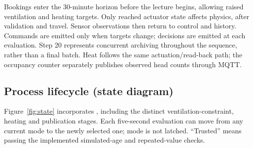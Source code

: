 \documentclass[11pt,a4paper]{article}
\begin{document}
Bookings enter the 30-minute horizon before the lecture begins, allowing raised ventilation and heating targets. Only reached actuator state affects physics, after validation and travel. Sensor observations then return to control and history. Commands are emitted only when targets change; decisions are emitted at each evaluation. Step 20 represents concurrent archiving throughout the sequence, rather than a final batch. Heat follows the same actuation/read-back path; the occupancy counter separately publishes observed head counts through MQTT.

\subsection{Process lifecycle (state diagram)}
Figure~\ref{fig:state} incorporates , including the distinct ventilation-constraint, heating and publication stages. Each five-second evaluation can move from any current mode to the newly selected one; mode is not latched. ``Trusted'' means passing the implemented simulated-age and repeated-value checks.
\end{document}
